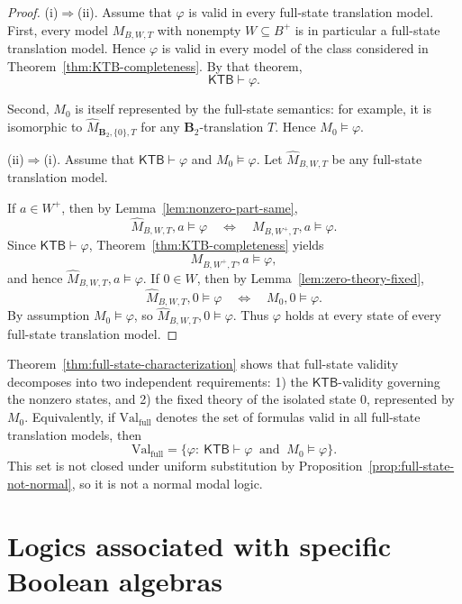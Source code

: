 \documentclass[11pt]{amsart}
\theoremstyle{definition}
\theoremstyle{plain}
\newcommand{\Btwo}{\mathbf{B}_2}
\begin{document}
\begin{proof}
(i)$\Rightarrow$(ii).
Assume that $\varphi$ is valid in every full-state translation model.
First, every model $M_{B,W,T}$ with nonempty $W\subseteq B^+$ is in particular a full-state
translation model. Hence $\varphi$ is valid in every model of the class considered in
Theorem~\ref{thm:KTB-completeness}. By that theorem,
\[
\mathsf{KTB}\vdash \varphi.
\]

Second, $M_0$ is itself represented by the full-state semantics:
for example, it is isomorphic to $\widehat M_{\Btwo,\{0\},T}$ for any $\Btwo$-translation $T$.
Hence $M_0\models \varphi$.

(ii)$\Rightarrow$(i).
Assume that $\mathsf{KTB}\vdash\varphi$ and $M_0\models \varphi$.
Let $\widehat M_{B,W,T}$ be any full-state translation model.

If $a\in W^+$, then by Lemma~\ref{lem:nonzero-part-same},
\[
\widehat M_{B,W,T},a\models \varphi
\quad\Longleftrightarrow\quad
M_{B,W^+,T},a\models \varphi.
\]
Since $\mathsf{KTB}\vdash\varphi$, Theorem~\ref{thm:KTB-completeness} yields
\[
M_{B,W^+,T},a\models \varphi,
\]
and hence $\widehat M_{B,W,T},a\models \varphi$.
If $0\in W$, then by Lemma~\ref{lem:zero-theory-fixed},
\[
\widehat M_{B,W,T},0\models \varphi
\quad\Longleftrightarrow\quad
M_0,0\models \varphi.
\]
By assumption $M_0\models \varphi$, so $\widehat M_{B,W,T},0\models \varphi$.
Thus $\varphi$ holds at every state of every full-state translation model.
\end{proof}


Theorem~\ref{thm:full-state-characterization} shows that full-state validity decomposes into two
independent requirements: 1) the $\mathsf{KTB}$-validity governing the nonzero states, and 2) the fixed theory of the isolated state $0$, represented by $M_0$.
Equivalently, if $\mathrm{Val}_{\mathrm{full}}$ denotes the set of formulas valid in all full-state
translation models, then
\[
\mathrm{Val}_{\mathrm{full}}
=
\{\varphi:\ \mathsf{KTB}\vdash \varphi\ \text{ and }\ M_0\models \varphi\}.
\]
This set is not closed under uniform substitution by Proposition~\ref{prop:full-state-not-normal},
so it is not a normal modal logic.







\section{Logics associated with specific Boolean algebras}\label{sec:specific-boolean-logics}
\end{document}
